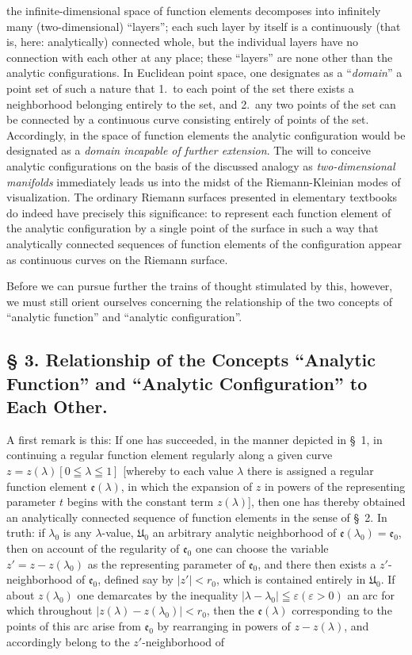 \documentclass{article}
\begin{document}
the infinite-dimensional space of function elements decomposes into infinitely many (two-dimensional) ``layers''; each such layer by itself is a continuously (that is, here: analytically) connected whole, but the individual layers have no connection with each other at any place; these ``layers'' are none other than the analytic configurations. In Euclidean point space, one designates as a ``\emph{domain}'' a point set of such a nature that 1.\ to each point of the set there exists a neighborhood belonging entirely to the set, and 2.\ any two points of the set can be connected by a continuous curve consisting entirely of points of the set. Accordingly, in the space of function elements the analytic configuration would be designated as a \emph{domain incapable of further extension}. The will to conceive analytic configurations on the basis of the discussed analogy as \emph{two-dimensional manifolds} immediately leads us into the midst of the Riemann-Kleinian modes of visualization. The ordinary Riemann surfaces presented in elementary textbooks do indeed have precisely this significance: to represent each function element of the analytic configuration by a single point of the surface in such a way that analytically connected sequences of function elements of the configuration appear as continuous curves on the Riemann surface.

Before we can pursue further the trains of thought stimulated by this, however, we must still orient ourselves concerning the relationship of the two concepts of ``analytic function'' and ``analytic configuration''.

\subsection*{§ 3. Relationship of the Concepts ``Analytic Function'' and ``Analytic Configuration'' to Each Other.}

A first remark is this: If one has succeeded, in the manner depicted in §~1, in continuing a regular function element regularly along a given curve $z = z(\lambda) [0 \leqq \lambda \leqq 1]$ [whereby to each value $\lambda$ there is assigned a regular function element $\mathfrak{e}(\lambda)$, in which the expansion of $z$ in powers of the representing parameter $t$ begins with the constant term $z(\lambda)$], then one has thereby obtained an analytically connected sequence of function elements in the sense of §~2. In truth: if $\lambda_0$ is any $\lambda$-value, $\mathfrak{U}_0$ an arbitrary analytic neighborhood of $\mathfrak{e}(\lambda_0) = \mathfrak{e}_0$, then on account of the regularity of $\mathfrak{e}_0$ one can choose the variable $z' = z - z(\lambda_0)$ as the representing parameter of $\mathfrak{e}_0$, and there then exists a $z'$-neighborhood of $\mathfrak{e}_0$, defined say by $|z'| < r_0$, which is contained entirely in $\mathfrak{U}_0$. If about $z(\lambda_0)$ one demarcates by the inequality $|\lambda - \lambda_0| \leqq \varepsilon (\varepsilon > 0)$ an arc for which throughout $|z(\lambda) - z(\lambda_0)| < r_0$, then the $\mathfrak{e}(\lambda)$ corresponding to the points of this arc arise from $\mathfrak{e}_0$ by rearranging in powers of $z - z(\lambda)$, and accordingly belong to the $z'$-neighborhood of
\end{document}
